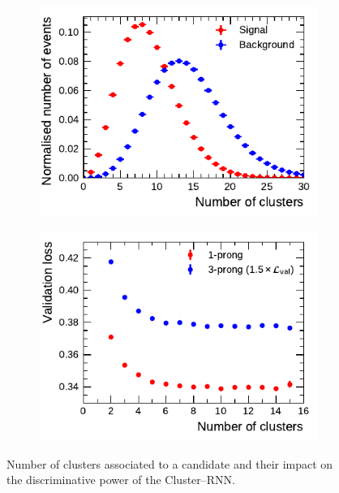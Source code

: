 \begin{figure}[htb]
  \begin{subfigure}[t]{0.48\textwidth}
    \centering
    \includegraphics{./figures/rnn/ncls_1p.pdf}
  \end{subfigure}\hfill
  \begin{subfigure}[t]{0.48\textwidth}
    \centering
    \includegraphics{./figures/rnn/nscan/cluster_1p_3p.pdf}
  \end{subfigure}
  \caption[Number of clusters associated to \tauhadvis candidates and their
  impact on the discriminative power of tau identification]{Number of clusters
    associated to a \tauhadvis candidate and their impact on the discriminative
    power of the Cluster--RNN.}
  \label{fig:rnn_nclusters}
\end{figure}

